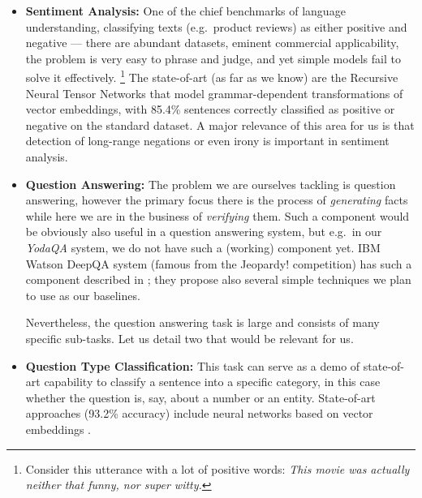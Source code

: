\documentclass[11pt,a4paper]{article}
\begin{document}
\begin{itemize}
	\item \textbf{Sentiment Analysis:} One of the chief benchmarks of
		language understanding, classifying texts (e.g.\ product
		reviews) as either positive and negative --- there are
		abundant datasets, eminent commercial applicability,
		the problem is very easy to phrase and judge, and yet
		simple models fail to solve it effectively.%
\footnote{Consider this utterance with a lot of positive words:
		\textit{This movie was actually neither that funny, nor super witty.}}
		The state-of-art (as far as we know) are the Recursive
		Neural Tensor Networks that model grammar-dependent
		transformations of vector embeddings, with
		85.4\% sentences correctly classified as positive or
		negative on the standard dataset. \cite{SentimentRNTN}
		A major relevance of this area for us is that detection
		of long-range negations or even irony is important in
		sentiment analysis.

	\item \textbf{Question Answering:} The problem we are ourselves
		tackling is question answering, however the primary focus
		there is the process of \textit{generating} facts while
		here we are in the business of \textit{verifying} them.
		Such a component would be obviously also useful in
		a question answering system, but e.g.\ in our \textit{YodaQA}
		system, we do not have such a (working) component yet.
		IBM Watson DeepQA system (famous from the Jeopardy! competition)
		has such a component described in \cite{WatsonEvidence};
		they propose also several simple techniques we plan to
		use as our baselines.

		Nevertheless, the question answering task is large and
		consists of many specific sub-tasks.  Let us detail two
		that would be relevant for us.

	\item \textbf{Question Type Classification:} This task can serve
		as a demo of state-of-art capability to classify a sentence
		into a specific category, in this case whether the question
		is, say, about a number or an entity.  State-of-art approaches
		(93.2\% accuracy)
		include neural networks based on vector embeddings \cite{QtcDCNN}.


\end{itemize}
\end{document}
